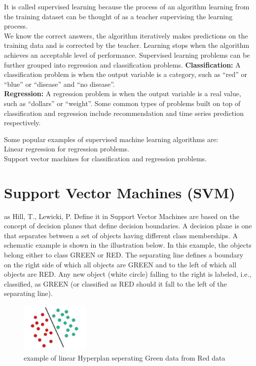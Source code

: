 It is called supervised learning because the process of an algorithm learning from the training dataset can be thought of as a teacher supervising the learning process.\\ We know the correct answers, the algorithm iteratively makes predictions on the training data and is corrected by the teacher. Learning stops when the algorithm achieves an acceptable level of performance.
Supervised learning problems can be further grouped into regression and classification problems.
\textbf{Classification:} A classification problem is when the output variable is a category, such as “red” or “blue” or “disease” and “no disease”.\\ \textbf{Regression:}  A regression problem is when the output variable is a real value, such as “dollars” or “weight”.
Some common types of problems built on top of classification and regression include recommendation and time series prediction respectively.

Some popular examples of supervised machine learning algorithms are:\\
Linear regression for regression problems.\\
Support vector machines for classification and regression problems.\\




\section{Support Vector Machines (SVM) }\label{sec:svm}
as Hill, T., Lewicki, P. Define it in \cite{svm} Support Vector Machines are based on the concept of decision planes that define decision boundaries. A decision plane is one that separates between a set of objects having different class memberships. A schematic example is shown in the illustration below. In this example, the objects belong either to class GREEN or RED. The separating line defines a boundary on the right side of which all objects are GREEN and to the left of which all objects are RED. Any new object (white circle) falling to the right is labeled, i.e., classified, as GREEN (or classified as RED should it fall to the left of the separating line).


\begin{figure}[H]
\centering
\includegraphics[width=0.3\textwidth]{img/svm1.png}
\caption{example of linear Hyperplan seperating Green data from Red data }
\label{122 }
\end{figure}


